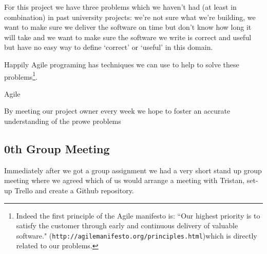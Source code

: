 \documentclass[11pt]{article}
\begin{document}
For this project we have three problems which we haven't had (at least in combination) in past university projects: we're not sure what we're building, we want to make sure we deliver the software on time but don't know how long it will take and
we want to make sure the software we write is correct and useful but have no easy way to define `correct' or `useful' in this domain.

Happily Agile programing has techniques we can use to help to solve these problems\footnote{Indeed the first principle of the Agile manifesto is: ``Our highest priority is to satisfy the customer
through early and continuous delivery of valuable software." ({\tt http://agilemanifesto.org/principles.html})which is directly related to our problems.}.

Agile 

By meeting our project owner every week we hope to foster an accurate understanding of the prowe problems

\subsection{0th Group Meeting}
Immediately after we got a group assignment we had a very short stand up group meeting where we agreed which of us would arrange a meeting with Tristan, set-up Trello and create a Github repository.  
\end{document}
